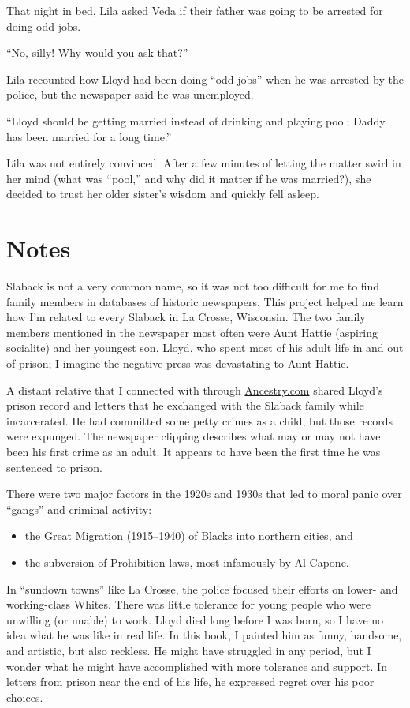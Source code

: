 \documentclass[
  american,
  letterpaper,
]{book}
\providecommand{\tightlist}{%
  \setlength{\itemsep}{0pt}\setlength{\parskip}{0pt}}\usepackage{longtable,booktabs,array}
\begin{document}
That night in bed, Lila asked Veda if their father was going to be
arrested for doing odd jobs.

``No, silly! Why would you ask that?''

Lila recounted how Lloyd had been doing ``odd jobs'' when he was
arrested by the police, but the newspaper said he was unemployed.

``Lloyd should be getting married instead of drinking and playing pool;
Daddy has been married for a long time.''

Lila was not entirely convinced. After a few minutes of letting the
matter swirl in her mind (what was ``pool,'' and why did it matter if he
was married?), she decided to trust her older sister's wisdom and
quickly fell asleep.

\section{Notes}\label{notes-9}

Slaback is not a very common name, so it was not too difficult for me to
find family members in databases of historic newspapers. This project
helped me learn how I'm related to every Slaback in La Crosse,
Wisconsin. The two family members mentioned in the newspaper most often
were Aunt Hattie (aspiring socialite) and her youngest son, Lloyd, who
spent most of his adult life in and out of prison; I imagine the
negative press was devastating to Aunt Hattie.

A distant relative that I connected with through
\href{https://www.ancestry.com/}{Ancestry.com} shared Lloyd's prison
record and letters that he exchanged with the Slaback family while
incarcerated. He had committed some petty crimes as a child, but those
records were expunged. The newspaper clipping describes what may or may
not have been his first crime as an adult. It appears to have been the
first time he was sentenced to prison.

There were two major factors in the 1920s and 1930s that led to moral
panic over ``gangs'' and criminal activity:

\begin{itemize}
\tightlist
\item
  the Great Migration (1915--1940) of Blacks into northern cities, and
\item
  the subversion of Prohibition laws, most infamously by Al Capone.
\end{itemize}

In ``sundown towns'' like La Crosse, the police focused their efforts on
lower- and working-class Whites. There was little tolerance for young
people who were unwilling (or unable) to work. Lloyd died long before I
was born, so I have no idea what he was like in real life. In this book,
I painted him as funny, handsome, and artistic, but also reckless. He
might have struggled in any period, but I wonder what he might have
accomplished with more tolerance and support. In letters from prison
near the end of his life, he expressed regret over his poor choices.
\end{document}
